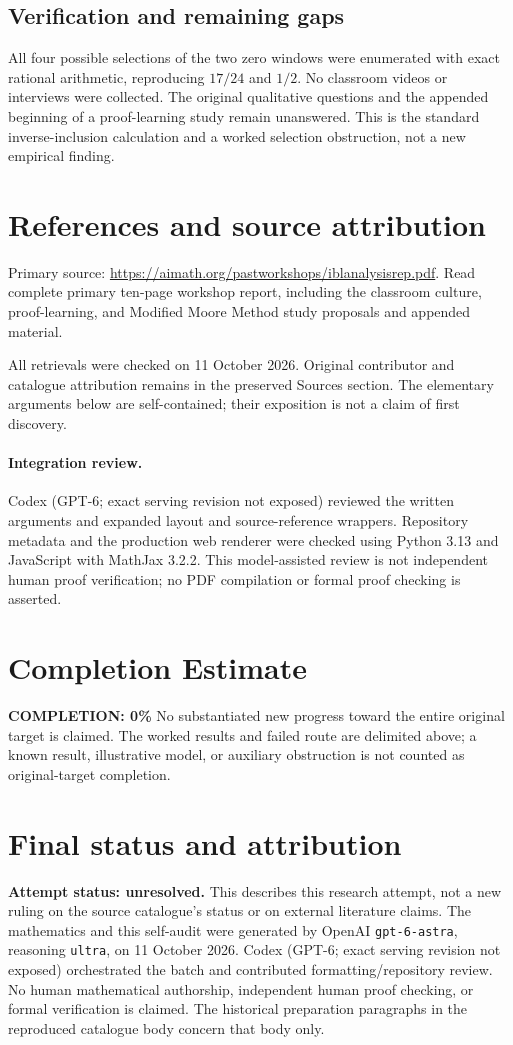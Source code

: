 \documentclass[11pt]{article}
\begin{document}
\subsection{Verification and remaining gaps}
All four possible selections of the two zero windows were enumerated with exact rational arithmetic, reproducing $17/24$ and $1/2$. No classroom videos or interviews were collected. The original qualitative questions and the appended beginning of a proof-learning study remain unanswered. This is the standard inverse-inclusion calculation and a worked selection obstruction, not a new empirical finding.

\section{References and source attribution}
Primary source: \url{https://aimath.org/pastworkshops/iblanalysisrep.pdf}. Read complete primary ten-page workshop report, including the classroom culture, proof-learning, and Modified Moore Method study proposals and appended material.

All retrievals were checked on 11 October 2026. Original contributor and catalogue attribution remains in the preserved Sources section. The elementary arguments below are self-contained; their exposition is not a claim of first discovery.


\paragraph{Integration review.} Codex (GPT-6; exact serving revision not exposed) reviewed the written arguments and expanded layout and source-reference wrappers. Repository metadata and the production web renderer were checked using Python 3.13 and JavaScript with MathJax 3.2.2. This model-assisted review is not independent human proof verification; no PDF compilation or formal proof checking is asserted.

\section{Completion Estimate}
\noindent\textbf{COMPLETION: 0\%}
No substantiated new progress toward the entire original target is claimed. The worked results and failed route are delimited above; a known result, illustrative model, or auxiliary obstruction is not counted as original-target completion.

\section{Final status and attribution}
\textbf{Attempt status: unresolved.} This describes this research attempt, not a new ruling on the source catalogue's status or on external literature claims.
The mathematics and this self-audit were generated by OpenAI \texttt{gpt-6-astra}, reasoning \texttt{ultra}, on 11 October 2026. Codex (GPT-6; exact serving revision not exposed) orchestrated the batch and contributed formatting/repository review. No human mathematical authorship, independent human proof checking, or formal verification is claimed. The historical preparation paragraphs in the reproduced catalogue body concern that body only.
\end{document}
